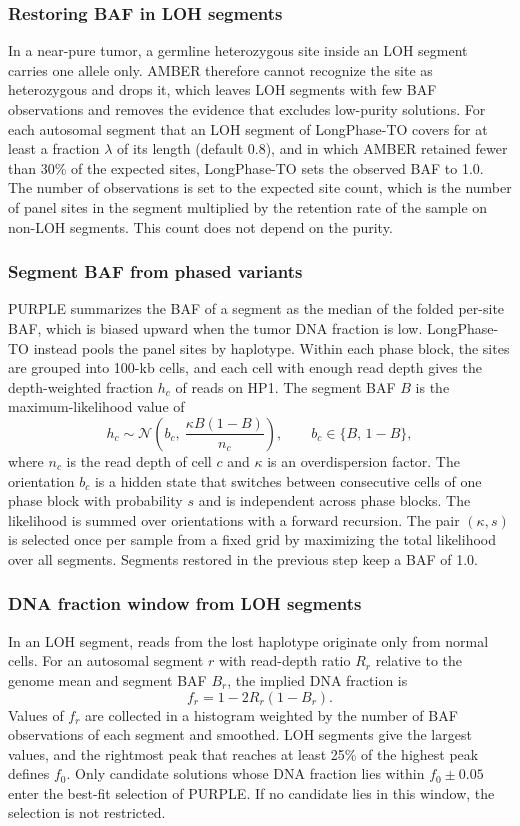 \documentclass[unnumsec,webpdf,contemporary,large]{oup-authoring-template}
\begin{document}
\subsubsection{Restoring BAF in LOH segments}

In a near-pure tumor, a germline heterozygous site inside an LOH segment carries one allele only. AMBER therefore cannot recognize the site as heterozygous and drops it, which leaves LOH segments with few BAF observations and removes the evidence that excludes low-purity solutions. For each autosomal segment that an LOH segment of LongPhase-TO covers for at least a fraction $\lambda$ of its length (default 0.8), and in which AMBER retained fewer than 30\% of the expected sites, LongPhase-TO sets the observed BAF to 1.0. The number of observations is set to the expected site count, which is the number of panel sites in the segment multiplied by the retention rate of the sample on non-LOH segments. This count does not depend on the purity.

\subsubsection{Segment BAF from phased variants}

PURPLE summarizes the BAF of a segment as the median of the folded per-site BAF, which is biased upward when the tumor DNA fraction is low. LongPhase-TO instead pools the panel sites by haplotype. Within each phase block, the sites are grouped into 100-kb cells, and each cell with enough read depth gives the depth-weighted fraction $h_c$ of reads on HP1. The segment BAF $B$ is the maximum-likelihood value of
\[
h_c \sim \mathcal{N}\!\left(b_c,\ \frac{\kappa B(1-B)}{n_c}\right),\qquad b_c \in \{B,\,1-B\},
\]
where $n_c$ is the read depth of cell $c$ and $\kappa$ is an overdispersion factor. The orientation $b_c$ is a hidden state that switches between consecutive cells of one phase block with probability $s$ and is independent across phase blocks. The likelihood is summed over orientations with a forward recursion. The pair $(\kappa, s)$ is selected once per sample from a fixed grid by maximizing the total likelihood over all segments. Segments restored in the previous step keep a BAF of 1.0.

\subsubsection{DNA fraction window from LOH segments}

In an LOH segment, reads from the lost haplotype originate only from normal cells. For an autosomal segment $r$ with read-depth ratio $R_r$ relative to the genome mean and segment BAF $B_r$, the implied DNA fraction is
\[
f_r = 1 - 2R_r(1 - B_r).
\]
Values of $f_r$ are collected in a histogram weighted by the number of BAF observations of each segment and smoothed. LOH segments give the largest values, and the rightmost peak that reaches at least 25\% of the highest peak defines $f_0$. Only candidate solutions whose DNA fraction lies within $f_0 \pm 0.05$ enter the best-fit selection of PURPLE. If no candidate lies in this window, the selection is not restricted.
\end{document}
